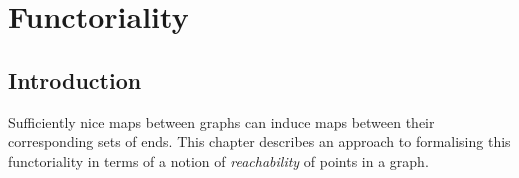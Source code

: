 \chapter{Functoriality}\label{chap:functoriality}

\section{Introduction}

Sufficiently nice maps between graphs can induce maps between their corresponding sets of ends. This chapter describes an approach to formalising this functoriality in terms of a notion of \emph{reachability} of points in a graph.
